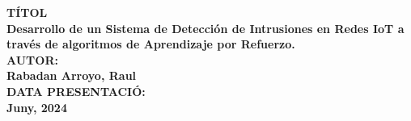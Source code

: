 \begin{titlepage}


    \vspace{1.5cm}

    \vfill
    \textbf{TÍTOL} \\ \textbf{Desarrollo de un Sistema de Detección de Intrusiones en Redes IoT a través de algoritmos de Aprendizaje por Refuerzo.} 
    \\[\baselineskip]
    \textbf{AUTOR:} \\ \textbf{Rabadan Arroyo, Raul} 
    \\[\baselineskip]
    \textbf{DATA PRESENTACIÓ:} \\ \textbf{Juny, 2024}
    \vfill

\end{titlepage}

